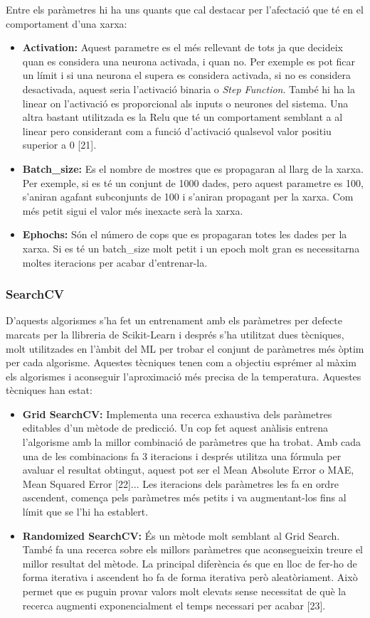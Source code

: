 \documentclass[10pt,a4paper,twocolumn,twoside]{article}
\begin{document}
Entre els paràmetres hi ha uns quants que cal destacar per l'afectació que té en el comportament d'una xarxa:
 \begin{itemize}
\item \textbf{Activation:} Aquest parametre es el més rellevant de tots ja que decideix quan es considera una neurona activada, i quan no. Per exemple es pot ficar un límit i si una neurona el supera es considera activada, si no es considera desactivada, aquest seria l'activació binaria o \textit{Step Function}. També hi ha la linear on l'activació es proporcional als inputs o neurones del sistema. Una altra bastant utilitzada es la Relu que té un comportament semblant a al linear pero considerant com a funció d'activació qualsevol valor positiu superior a 0 [21].
\item \textbf{Batch\_size:} Es el nombre de mostres que es propagaran al llarg de la xarxa. Per exemple, si es té un conjunt de 1000 dades, pero aquest parametre es 100, s'aniran agafant subconjunts de 100 i s'aniran propagant per la xarxa. Com més petit sigui el valor més inexacte serà la xarxa.
\item \textbf{Ephochs:} Són el número de cops que es propagaran totes les dades per la xarxa. Si es té un batch\_size molt petit i un epoch molt gran es necessitarna moltes iteracions per acabar d'entrenar-la.
\end{itemize}

\subsubsection{SearchCV}
D'aquests algorismes s'ha fet un entrenament amb els paràmetres per defecte marcats per la llibreria de Scikit-Learn i després s'ha utilitzat dues tècniques, molt utilitzades en l'àmbit del ML per trobar el conjunt de paràmetres més òptim per cada algorisme. Aquestes tècniques tenen com a objectiu esprémer al màxim els algorismes i aconseguir l'aproximació més precisa de la temperatura. Aquestes tècniques han estat:
 \begin{itemize}
\item \textbf{Grid SearchCV:} Implementa una recerca exhaustiva dels paràmetres editables d'un mètode de predicció. Un cop fet aquest anàlisis entrena l'algorisme amb la millor combinació de paràmetres que ha trobat. Amb cada una de les combinacions fa 3 iteracions i després utilitza una fórmula per avaluar el resultat obtingut, aquest pot ser el Mean Absolute Error o MAE, Mean Squared Error [22]... Les iteracions dels paràmetres les fa en ordre ascendent, comença pels paràmetres més petits i va augmentant-los fins al límit que se l'hi ha establert.
\item \textbf{Randomized SearchCV:} És un mètode molt semblant al Grid Search. També fa una recerca sobre els millors paràmetres que aconsegueixin treure el millor resultat del mètode. La principal diferència és que en lloc de fer-ho de forma iterativa i ascendent ho fa de forma iterativa però aleatòriament. Això permet que es puguin provar valors molt elevats sense necessitat de què la recerca augmenti exponencialment el temps necessari per acabar [23].
\end{itemize}
\end{document}
